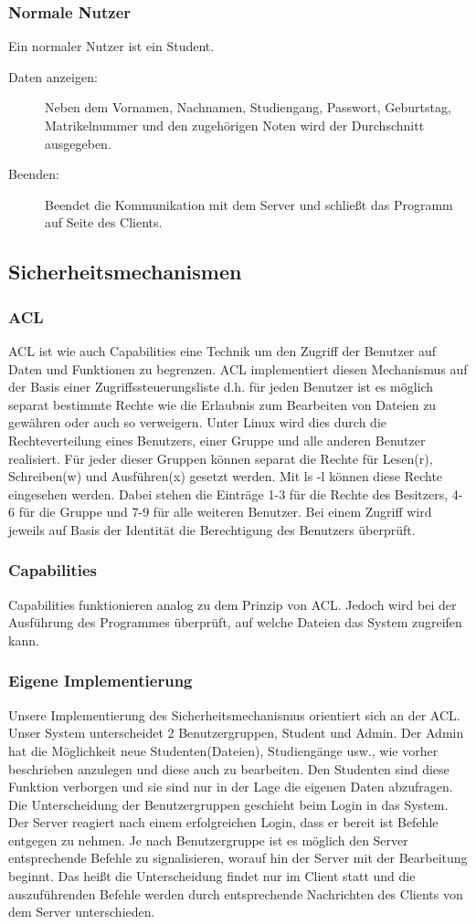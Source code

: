 \documentclass{scrartcl}
\begin{document}
			\subsubsection{Normale Nutzer}
			Ein normaler Nutzer ist ein Student.
			\begin{description}
				\item[Daten anzeigen:] Neben dem  Vornamen, Nachnamen, Studiengang, Passwort, Geburtstag, Matrikelnummer  und den zugehörigen Noten wird der Durchschnitt ausgegeben.
				\item[Beenden:] Beendet die Kommunikation mit dem Server und schließt das Programm auf Seite des Clients.
			\end{description}
	\subsection{Sicherheitsmechanismen}
		\subsubsection{ACL}
		ACL ist wie auch Capabilities eine Technik um den Zugriff der Benutzer auf Daten und Funktionen zu begrenzen. ACL implementiert diesen Mechanismus auf der Basis einer Zugriffssteuerungsliste d.h. für jeden Benutzer ist es möglich separat bestimmte Rechte wie die Erlaubnis zum Bearbeiten von Dateien zu gewähren oder auch so verweigern. Unter Linux wird dies durch die Rechteverteilung eines Benutzers, einer Gruppe und alle anderen Benutzer realisiert. Für jeder dieser Gruppen können separat die Rechte für Lesen(r), Schreiben(w) und Ausführen(x) gesetzt werden. Mit ls -l können diese Rechte eingesehen werden. Dabei stehen die Einträge 1-3 für die Rechte des Besitzers, 4-6 für die Gruppe und 7-9 für alle weiteren Benutzer. Bei einem Zugriff wird jeweils auf Basis der Identität die Berechtigung des Benutzers überprüft.
		\subsubsection{Capabilities}
		Capabilities funktionieren analog zu dem Prinzip von ACL. Jedoch wird bei der Ausführung des Programmes überprüft, auf welche Dateien das System zugreifen kann.
		\subsubsection{Eigene Implementierung}
		Unsere Implementierung des Sicherheitsmechanismus orientiert sich an der ACL. Unser System unterscheidet 2 Benutzergruppen, Student und Admin. Der Admin hat die Möglichkeit neue Studenten(Dateien), Studiengänge usw., wie vorher beschrieben anzulegen und diese auch zu bearbeiten. Den Studenten sind diese Funktion verborgen und sie sind nur in der Lage die eigenen Daten abzufragen. Die Unterscheidung der Benutzergruppen geschieht beim Login in das System. Der Server reagiert nach einem erfolgreichen Login, dass er bereit ist Befehle entgegen zu nehmen. Je nach Benutzergruppe ist es möglich den Server entsprechende Befehle zu signalisieren, worauf hin der Server mit der Bearbeitung beginnt. Das heißt die Unterscheidung findet nur im Client statt und die auszuführenden Befehle werden durch entsprechende Nachrichten des Clients von dem Server unterschieden.
		
\end{document}
